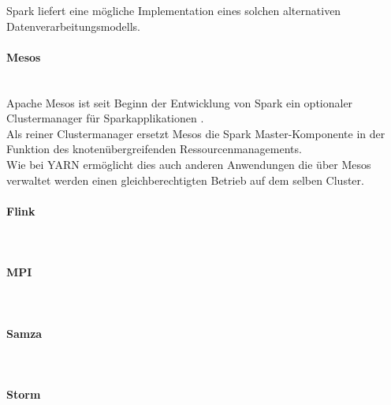 Spark liefert eine mögliche Implementation eines solchen alternativen Datenverarbeitungsmodells.

\paragraph{Mesos}\\
Apache Mesos ist seit Beginn der Entwicklung von Spark ein optionaler Clustermanager für Sparkapplikationen \cite{Mat12}.\\
Als reiner Clustermanager ersetzt Mesos die Spark Master-Komponente in der Funktion des knotenübergreifenden Ressourcenmanagements.\\
Wie bei YARN ermöglicht dies auch anderen Anwendungen die über Mesos verwaltet werden einen gleichberechtigten Betrieb auf dem selben Cluster.\\

\paragraph{Flink}\\

\paragraph{MPI}\\

\paragraph{Samza}\\

\paragraph{Storm}\\
